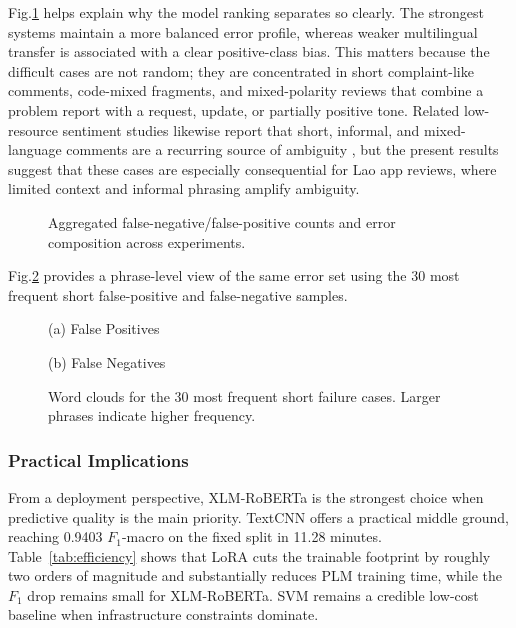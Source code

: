 \documentclass[conference, onecolumn]{IEEEtran}
\begin{document}
Fig.\ref{fig:error_analysis} helps explain why the model ranking separates so clearly. The strongest systems maintain a more balanced error profile, whereas weaker multilingual transfer is associated with a clear positive-class bias. This matters because the difficult cases are not random; they are concentrated in short complaint-like comments, code-mixed fragments, and mixed-polarity reviews that combine a problem report with a request, update, or partially positive tone. Related low-resource sentiment studies likewise report that short, informal, and mixed-language comments are a recurring source of ambiguity \cite{subramanian2025kec_tech_titans,chowdhury2025mysticciol}, but the present results suggest that these cases are especially consequential for Lao app reviews, where limited context and informal phrasing amplify ambiguity.

\enlargethispage{4\baselineskip}
\begin{figure}[!b]
\centering

\caption{Aggregated false-negative/false-positive counts and error composition across experiments.}
\label{fig:error_analysis}
\end{figure}





Fig.\ref{fig:short_fail_wordcloud} provides a phrase-level view of the same error set using the 30 most frequent short false-positive and false-negative samples.

\begin{figure}[!htbp]
\centering
\begin{minipage}[t]{0.42\textwidth}
\centering

{\small (a) False Positives}
\end{minipage}\hfill
\begin{minipage}[t]{0.42\textwidth}
\centering

{\small (b) False Negatives}
\end{minipage}
\caption{Word clouds for the 30 most frequent short failure cases. Larger phrases indicate higher frequency.}
\label{fig:short_fail_wordcloud}
\end{figure}

\subsubsection{Practical Implications}
From a deployment perspective, XLM-RoBERTa is the strongest choice when predictive quality is the main priority. TextCNN offers a practical middle ground, reaching 0.9403 $F_1$-macro on the fixed split in 11.28 minutes. Table~\ref{tab:efficiency} shows that LoRA cuts the trainable footprint by roughly two orders of magnitude and substantially reduces PLM training time, while the $F_1$ drop remains small for XLM-RoBERTa. SVM remains a credible low-cost baseline when infrastructure constraints dominate.
\end{document}
